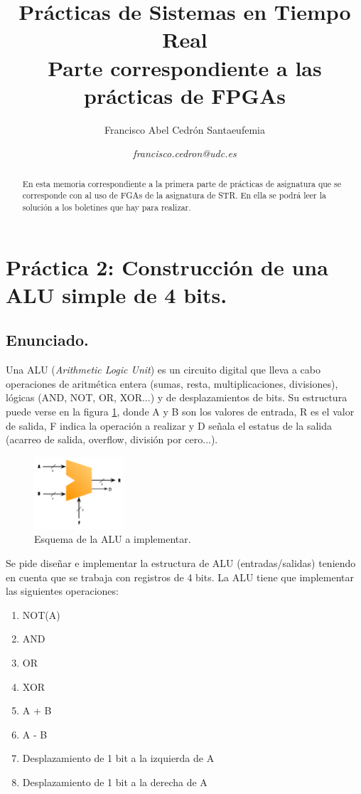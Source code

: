 \documentclass{article}
\title{\textbf{Prácticas de Sistemas en Tiempo Real} \\ Parte correspondiente a las prácticas de FPGAs}
\author{Francisco Abel Cedrón Santaeufemia \and \textit{francisco.cedron@udc.es}}
\date{} %
\begin{document}
\maketitle %

\renewcommand{\abstractname}{Abstract} %
\begin{abstract}
En esta memoria correspondiente a la primera parte de prácticas de asignatura que se corresponde con al uso de FGAs de la asignatura de STR. En ella se podrá leer la solución a los boletines que hay para realizar.
\end{abstract}

\renewcommand{\contentsname}{} %
\tableofcontents

\vspace{2cm} %

\section{Práctica 2: Construcción de una ALU simple de 4 bits.}
\subsection{Enunciado.}
 Una ALU (\textit{Arithmetic Logic Unit}) es un circuito digital que lleva a cabo operaciones de aritmética entera (sumas, resta, multiplicaciones, divisiones), lógicas (AND, NOT, OR, XOR...) y de desplazamientos de bits. Su estructura puede verse en la figura \ref{fig:p2:alu}, donde A y B son los valores de entrada, R es el valor de salida, F indica la operación a realizar y D señala el estatus de la salida (acarreo de salida, overflow, división por cero...).

\begin{figure}[h]
  \centering
    \includegraphics[width=0.3\textwidth]{img/ALU.pdf}
  \caption{Esquema de la ALU a implementar.}
  \label{fig:p2:alu}
\end{figure}

Se pide diseñar e implementar la estructura de ALU (entradas/salidas) teniendo en cuenta que se trabaja con registros de 4 bits. La ALU tiene que implementar las siguientes operaciones:
\begin{enumerate}
	\item NOT(A)
	\item AND
	\item OR
	\item XOR
	\item A + B
	\item A - B
	\item Desplazamiento de 1 bit a la izquierda de A
	\item Desplazamiento de 1 bit a la derecha de A
\end{enumerate}
\end{document}
